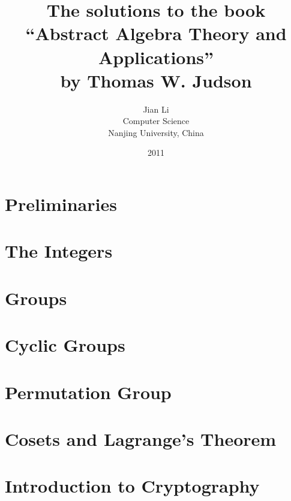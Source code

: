 \documentclass[12pt,a4paper]{article}
\begin{document}
\title{The solutions to the book \\ ``Abstract Algebra Theory and Applications'' \\ by Thomas W. Judson}
\author{Jian Li \\ Computer Science \\ Nanjing University, China}
\date{2011}
\maketitle
\pagebreak

\section{Preliminaries}
\pagebreak


\section{The Integers}




\pagebreak


\section{Groups}




\pagebreak


\section{Cyclic Groups}





\pagebreak


\section{Permutation Group}




\pagebreak

\section{Cosets and Lagrange's Theorem}




\pagebreak


\section{Introduction to Cryptography}

\pagebreak
\end{document}
